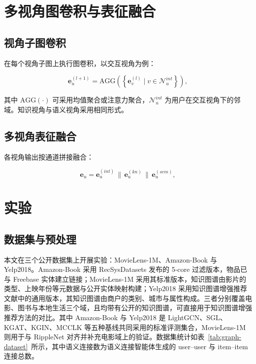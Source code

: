 \section{多视角图卷积与表征融合}
\label{sec:multi-view-gcn}

\subsection{视角子图卷积}
\label{subsec:view-gcn}

在每个视角子图上执行图卷积，以交互视角为例：

\begin{equation}
  \mathbf{e}_u^{(l+1)} = \mathrm{AGG}\left(\left\{\mathbf{e}_v^{(l)} \mid v\in\mathcal{N}_u^{int}\right\}\right),
  \label{eq:gcn}
\end{equation}

其中 $\mathrm{AGG}(\cdot)$ 可采用均值聚合或注意力聚合，$\mathcal{N}_u^{int}$ 为用户在交互视角下的邻域。知识视角与语义视角采用相同形式。

\subsection{多视角表征融合}
\label{subsec:view-fusion}

各视角输出按通道拼接融合：

\begin{equation}
  \mathbf{e}_u = \mathbf{e}_u^{(int)} \,\|\, \mathbf{e}_u^{(kn)} \,\|\, \mathbf{e}_u^{(sem)},
  \label{eq:view-fusion}
\end{equation}

\section{实验}
\label{sec:graph-experiments}

\subsection{数据集与预处理}
\label{subsec:graph-datasets}

本文在三个公开数据集上开展实验：MovieLens-1M、Amazon-Book 与 Yelp2018。Amazon-Book 采用 RecSysDatasets 发布的 5-core 过滤版本，物品已与 Freebase 实体建立链接；MovieLens-1M 采用其标准版本，知识图谱由影片的类型、上映年份等元数据与公开实体映射构建；Yelp2018 采用知识图谱增强推荐文献中的通用版本，其知识图谱由商户的类别、城市与属性构成。三者分别覆盖电影、图书与本地生活三个域，且均带有公开的知识图谱，可直接用于知识图谱增强推荐方法的对比。其中 Amazon-Book 与 Yelp2018 是 LightGCN、SGL、KGAT、KGIN、MCCLK 等五种基线共同采用的标准评测集合，MovieLens-1M 则用于与 RippleNet 对齐并补充电影域上的验证。数据集统计如表~\ref{tab:graph-dataset}~所示，其中语义连接数为语义连接智能体生成的 user--user 与 item--item 连接总数。

